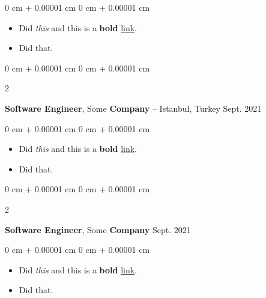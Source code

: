 \documentclass[10pt, letterpaper]{article}
\newenvironment{highlights}{
    \begin{itemize}[
        topsep=0.10 cm,
        parsep=0.10 cm,
        partopsep=0pt,
        itemsep=0pt,
        leftmargin=0 cm + 10pt
    ]
}{
    \end{itemize}
        
    \vspace{-0.10cm}
} %
\newenvironment{onecolentry}{
    \begin{adjustwidth}{
        0 cm + 0.00001 cm
    }{
        0 cm + 0.00001 cm
    }
}{
    \end{adjustwidth}
} %
\newenvironment{twocolentry}[2][]{
    \onecolentry
    \def\secondColumn{#2}
    \setcolumnwidth{\fill, 4.1 cm}
    \begin{paracol}{2}
}{
    \switchcolumn \raggedleft \secondColumn
    \end{paracol}
    \endonecolentry
} %
\begin{document}
        \vspace{0.10 cm}
        \begin{onecolentry}
            \begin{highlights}
                \item Did \textit{this} and this is a \textbf{bold} \href{https://example.com}{link}.
                \item Did that.
            \end{highlights}
        \end{onecolentry}


        \vspace{0.15 cm}

        \begin{twocolentry}{
            Sept. 2021
        }
            \textbf{Software Engineer}, Some \textbf{Company} -- Istanbul, Turkey\end{twocolentry}

        \vspace{0.10 cm}
        \begin{onecolentry}
            \begin{highlights}
                \item Did \textit{this} and this is a \textbf{bold} \href{https://example.com}{link}.
                \item Did that.
            \end{highlights}
        \end{onecolentry}


        \vspace{0.15 cm}

        \begin{twocolentry}{
            Sept. 2021
        }
            \textbf{Software Engineer}, Some \textbf{Company}\end{twocolentry}

        \vspace{0.10 cm}
        \begin{onecolentry}
            \begin{highlights}
                \item Did \textit{this} and this is a \textbf{bold} \href{https://example.com}{link}.
                \item Did that.
            \end{highlights}
        \end{onecolentry}


        \vspace{0.15 cm}
\end{document}
